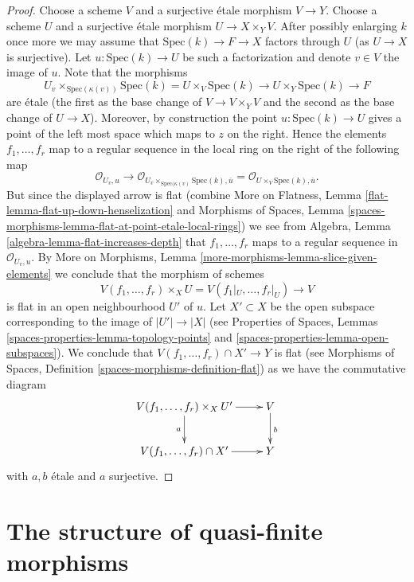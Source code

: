 \begin{proof}
\medskip\noindent
Choose a scheme $V$ and a surjective \'etale morphism
$V \to Y$. Choose a scheme $U$ and a surjective \'etale morphism
$U \to X \times_Y V$. After possibly enlarging $k$ once more we may
assume that $\text{Spec}(k) \to F \to X$ factors through $U$ (as
$U \to X$ is surjective). Let
$u : \text{Spec}(k) \to U$ be such a factorization and denote $v \in V$
the image of $u$. Note that the morphisms
$$
U_v \times_{\text{Spec}(\kappa(v))} \text{Spec}(k) =
U \times_V \text{Spec}(k) \to U \times_Y \text{Spec}(k) \to F
$$
are \'etale (the first as the base change of $V \to V \times_Y V$ and
the second as the base change of $U \to X$). Moreover, by construction
the point $u : \text{Spec}(k) \to U$ gives a point of the left most
space which maps to $z$ on the right. Hence the elements
$f_1, \ldots, f_r$ map to a regular sequence in the local ring
on the right of the following map
$$
\mathcal{O}_{U_v, u}
\longrightarrow
\mathcal{O}_{U_v \times_{\text{Spec}(\kappa(v)} \text{Spec}(k), \overline{u}}
=
\mathcal{O}_{U \times_V \text{Spec}(k), \overline{u}}.
$$
But since the displayed arrow is flat (combine
More on Flatness, Lemma \ref{flat-lemma-flat-up-down-henselization}
and
Morphisms of Spaces,
Lemma \ref{spaces-morphisms-lemma-flat-at-point-etale-local-rings})
we see from
Algebra, Lemma \ref{algebra-lemma-flat-increases-depth}
that $f_1, \ldots, f_r$ maps to a regular sequence in
$\mathcal{O}_{U_v, u}$. By
More on Morphisms, Lemma \ref{more-morphisms-lemma-slice-given-elements}
we conclude that the morphism of schemes
$$
V(f_1, \ldots, f_r) \times_X U = V(f_1|_U, \ldots, f_r|_U) \to V
$$
is flat in an open neighbourhood $U'$ of $u$. Let $X' \subset X$
be the open subspace corresponding to the image of
$|U'| \to |X|$ (see
Properties of Spaces, Lemmas
\ref{spaces-properties-lemma-topology-points} and
\ref{spaces-properties-lemma-open-subspaces}).
We conclude that $V(f_1, \ldots, f_r) \cap X' \to Y$ is flat
(see
Morphisms of Spaces, Definition \ref{spaces-morphisms-definition-flat})
as
we have the commutative diagram
$$
\xymatrix{
V(f_1, \ldots, f_r) \times_X U' \ar[d]_a \ar[r] & V \ar[d]^b \\
V(f_1, \ldots, f_r) \cap X' \ar[r] & Y
}
$$
with $a, b$ \'etale and $a$ surjective.
\end{proof}











\section{The structure of quasi-finite morphisms}
\label{section-structure-quasi-finite}


